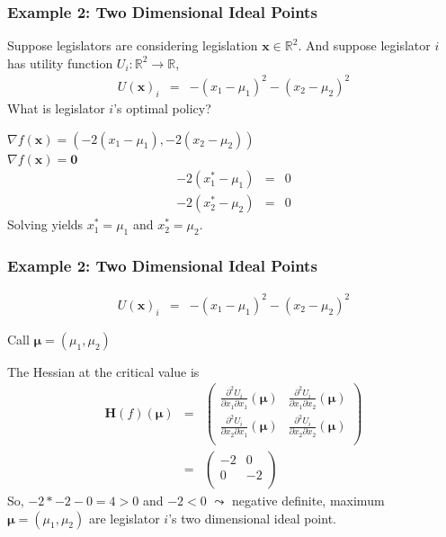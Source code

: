 \documentclass[handout]{beamer}
\numberwithin{equation}{section}
\begin{document}
\begin{frame}
\frametitle{Example 2: Two Dimensional Ideal Points}
Suppose legislators are considering legislation $\boldsymbol{x} \in \mathbb{R}^{2}$.  And suppose legislator $i$ has utility function $U_{i}: \mathbb{R}^{2} \rightarrow \mathbb{R}$, \pause
\begin{eqnarray}
U(\boldsymbol{x})_{i} & = & - (x_{1} - \mu_{1})^2 - (x_{2} - \mu_{2})^2 \nonumber 
\end{eqnarray} \pause
What is legislator $i$'s optimal policy? \pause

$\nabla f(\boldsymbol{x}) = ( -2 (x_{1} - \mu_{1} ) , -2 (x_{2} - \mu_{2} )  )$\\
$\nabla f(\boldsymbol{x}) = \boldsymbol{0} $ \pause
\begin{eqnarray}
- 2(x_{1}^{*} - \mu_{1} ) & = & 0 \nonumber \\
- 2(x_{2}^{*} - \mu_{2} ) & = & 0 \nonumber 
\end{eqnarray}  \pause
Solving yields $x_{1}^{*} = \mu_{1}$ and $x_{2}^{*} = \mu_{2}$.  

\end{frame}



\begin{frame}
\frametitle{Example 2: Two Dimensional Ideal Points} 

\begin{eqnarray}
U(\boldsymbol{x})_{i} & = & - (x_{1} - \mu_{1})^2 - (x_{2} - \mu_{2})^2 \nonumber 
\end{eqnarray} \pause

Call $\boldsymbol{\mu} = (\mu_{1}, \mu_{2} ) $\\ \pause

The Hessian at the critical value is \pause
\begin{eqnarray}
\boldsymbol{H}(f)(\boldsymbol{\mu} ) & = & \begin{pmatrix} 
\frac{\partial^{2} U_{i}} {\partial x_{1} \partial x_{1}} (\boldsymbol{\mu} ) & \frac{\partial^{2} U_{i}} {\partial x_{1} \partial x_{2}} (\boldsymbol{\mu} )  \\
\frac{\partial^{2} U_{i}} {\partial x_{2} \partial x_{1}} (\boldsymbol{\mu} ) & \frac{\partial^{2} U_{i}} {\partial x_{2} \partial x_{2}} (\boldsymbol{\mu} )\\
\end{pmatrix} \nonumber \\
& = & \begin{pmatrix} 
-2 & 0  \\
0 & -2  \\
\end{pmatrix} 
\nonumber 
\end{eqnarray} \pause
So, $-2 * -2 - 0  = 4 >0$ and $-2 <0$ $\leadsto$ \alert{negative definite}, \alert{maximum} \\
$\boldsymbol{\mu} = (\mu_{1}, \mu_{2})$ are legislator $i$'s two dimensional ideal point.  

\end{frame}
\end{document}
